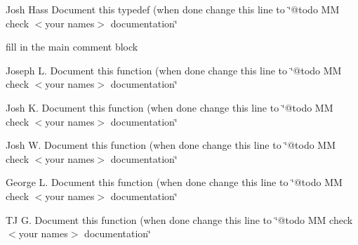 \begin{DoxyRefList}
\item[\label{todo__todo000010}%
\hypertarget{todo__todo000010}{}%
global\+Scope$>$ Global \hyperlink{group__list_ga608e5ebc97d34a9cd07a2c44925a1dc2}{identify\+\_\+fn\+\_\+t} )(void $\ast$, void $\ast$)]Josh Hass Document this typedef (when done change this line to \char`\"{}@todo M\+M check $<$your names$>$ documentation\char`\"{}  
\item[\label{todo__todo000008}%
\hypertarget{todo__todo000008}{}%
Module \hyperlink{group__list}{list} ]fill in the main comment block


\item[\label{todo__todo000017}%
\hypertarget{todo__todo000017}{}%
global\+Scope$>$ Global \hyperlink{group__list_ga26a446933466c8a9ecc7a86ffec8356e}{List\+\_\+\+Add} (\hyperlink{structlist__t}{list\+\_\+t} $\ast$list, void $\ast$item)]Joseph L. Document this function (when done change this line to \char`\"{}@todo M\+M check $<$your names$>$ documentation\char`\"{}  
\item[\label{todo__todo000016}%
\hypertarget{todo__todo000016}{}%
global\+Scope$>$ Global \hyperlink{group__list_gace91195eb28d548f091202d8a8fff06b}{List\+\_\+\+Add\+And\+Link} (\hyperlink{structlist__t}{list\+\_\+t} $\ast$list, void $\ast$item)]Josh K. Document this function (when done change this line to \char`\"{}@todo M\+M check $<$your names$>$ documentation\char`\"{}  
\item[\label{todo__todo000022}%
\hypertarget{todo__todo000022}{}%
global\+Scope$>$ Global \hyperlink{group__list_ga8d33461dcffd998d929eff432f32949d}{List\+\_\+\+Get\+First} (\hyperlink{structlist__t}{list\+\_\+t} $\ast$list)]Josh W. Document this function (when done change this line to \char`\"{}@todo M\+M check $<$your names$>$ documentation\char`\"{}  
\item[\label{todo__todo000025}%
\hypertarget{todo__todo000025}{}%
global\+Scope$>$ Global \hyperlink{group__list_ga546288a184f0ac8d5a44e4eb8fb9aab6}{List\+\_\+\+Get\+Item} (\hyperlink{structlist__t}{list\+\_\+t} $\ast$list, void $\ast$identifier)]George L. Document this function (when done change this line to \char`\"{}@todo M\+M check $<$your names$>$ documentation\char`\"{}  
\item[\label{todo__todo000023}%
\hypertarget{todo__todo000023}{}%
global\+Scope$>$ Global \hyperlink{group__list_ga9dab427e2a969ed55c7b2367739f58bd}{List\+\_\+\+Get\+Last} (\hyperlink{structlist__t}{list\+\_\+t} $\ast$list)]T\+J G. Document this function (when done change this line to \char`\"{}@todo M\+M check $<$your names$>$ documentation\char`\"{}  

\end{DoxyRefList}
